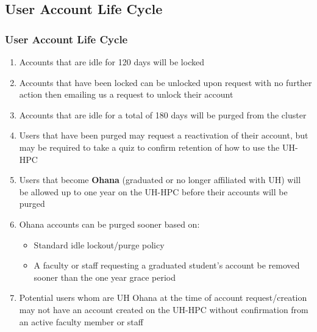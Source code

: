 \subsection{User Account Life Cycle}
\begin{frame}
\frametitle{User Account Life Cycle}
\begin{enumerate}
\item Accounts that are idle for 120 days will be locked
\item Accounts that have been locked can be unlocked upon request with no further action then emailing us a request to unlock their account
\item Accounts that are idle for a total of 180 days will be purged from the cluster
\item Users that have been purged may request a reactivation of their account, but may be required to take a quiz to confirm retention of how to use the UH-HPC
\item Users that become \textbf{Ohana} (graduated or no longer affiliated with UH) will be allowed up to one year on the UH-HPC before their accounts will be purged  
\item Ohana accounts can be purged sooner based on:
\begin{itemize}
\item Standard idle lockout/purge policy   
\item A faculty or staff requesting a graduated student's account be removed sooner than the one year grace period
\end{itemize}
\item Potential users whom are UH Ohana at the time of account request/creation may not have an account created on the UH-HPC without confirmation from an active faculty member or staff
\end{enumerate}
\end{frame}


